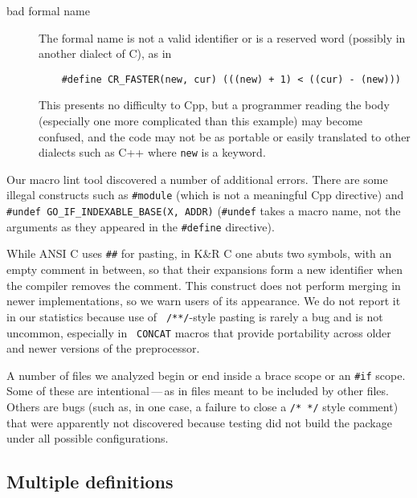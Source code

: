 \documentclass[10pt]{article}
\begin{document}
\begin{description}
\item[bad formal name]
        The formal name is not a valid identifier or is a reserved word
        (possibly in another dialect of C), as in
\begin{verbatim}
    #define CR_FASTER(new, cur) (((new) + 1) < ((cur) - (new)))
\end{verbatim}
        This presents no difficulty to Cpp, but a programmer reading the
        body (especially one more complicated than this example) may become
        confused, and the code may not be as portable or easily translated
        to other dialects such as C++ where {\tt new} is a keyword. 

\end{description}


Our macro lint tool discovered a number of additional
errors.  There are some illegal constructs such as {\tt \#module} (which
is not a meaningful Cpp directive) and {\tt \#undef
\verb|GO_IF_INDEXABLE_BASE|(X, ADDR)} ({\tt \#undef} takes a macro name,
not the arguments as they appeared in the {\tt \#define} directive).
  
While ANSI C uses {\tt \#\#} for pasting, in K\&R C one abuts two symbols,
with an empty comment in between, so that their expansions form a new
identifier when the compiler removes the comment.  This construct does not
perform merging in newer implementations, so we warn users of its
appearance.  We do not report it in our statistics because use of {\tt
/**/}-style pasting is rarely a bug and is not uncommon, especially in {\tt
CONCAT} macros that provide portability across older and newer versions of
the preprocessor.

A number of files we analyzed begin or end inside a brace scope or an
{\tt \#if} scope.  Some of these are intentional\,---\,as in files meant to
be included by other files.  Others are bugs (such as, in one case, a
failure to close a {\tt /* */} style comment) that were apparently not
discovered because testing did not build the package under all possible
configurations.



\subsection{Multiple definitions}
\label{sec:mult-def}
\end{document}
